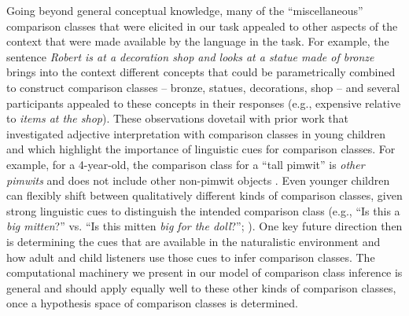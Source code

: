 \documentclass[doc, floatsintext]{apa6}
\begin{document}
Going beyond general conceptual knowledge, many of the ``miscellaneous'' comparison classes that were elicited in our task appealed to other aspects of the context that were made available by the language in the task.
For example, the sentence \emph{Robert is at a decoration shop and looks at a statue made of bronze} brings into the context different concepts that could be parametrically combined to construct comparison classes -- bronze, statues, decorations, shop -- and several participants appealed to these concepts in their responses (e.g., expensive relative to \emph{items at the shop}).
These observations dovetail with prior work that investigated adjective interpretation with comparison classes in young children and which highlight the importance of linguistic cues for comparison classes.
For example, for a 4-year-old, the comparison class for a ``tall pimwit'' is \emph{other pimwits} and does not include other non-pimwit objects \cite{Barner2008}.
Even younger children can flexibly shift between qualitatively different kinds of comparison classes, given strong linguistic cues to distinguish the intended comparison class (e.g., ``Is this a \emph{big mitten}?'' vs. ``Is this mitten \emph{big for the doll}?''; ).
One key future direction then is determining the cues that are available in the naturalistic environment and how adult and child listeners use those cues to infer comparison classes.
The computational machinery we present in our model of comparison class inference is general and should apply equally well to these other kinds of comparison classes, once a hypothesis space of comparison classes is determined.


\end{document}
